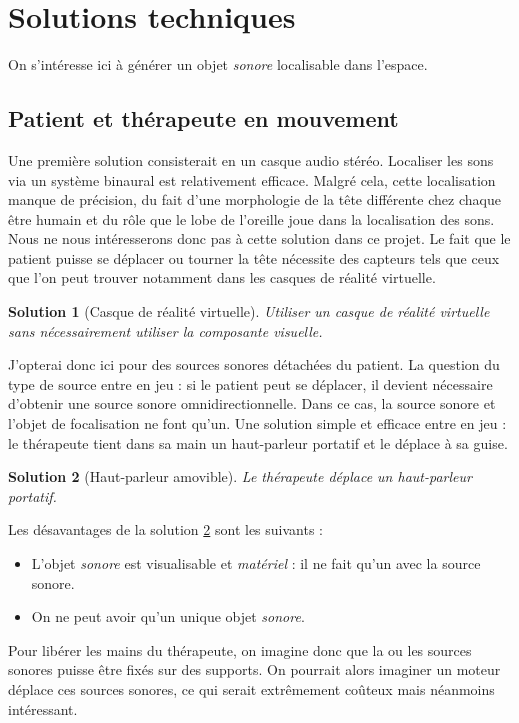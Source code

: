 \documentclass[french]{article}
\newtheorem{sol}{Solution}
\begin{document}
\section{Solutions techniques}

On s'intéresse ici à générer un objet \emph{sonore} localisable dans l'espace.

\subsection{Patient et thérapeute en mouvement}

Une première solution consisterait en un casque audio stéréo. Localiser les sons via un système binaural est relativement efficace. Malgré cela, cette localisation manque de précision, du fait d'une morphologie de la tête différente chez chaque être humain et du rôle que le lobe de l'oreille joue dans la localisation des sons. Nous ne nous intéresserons donc pas à cette solution dans ce projet. Le fait que le patient puisse se déplacer ou tourner la tête nécessite des capteurs tels que ceux que l'on peut trouver notamment dans les casques de réalité virtuelle.
\begin{sol}[Casque de réalité virtuelle]
	Utiliser un casque de réalité virtuelle sans nécessairement utiliser la composante visuelle.
\end{sol}

J'opterai donc ici pour des sources sonores détachées du patient. La question du type de source entre en jeu : si le patient peut se déplacer, il devient nécessaire d'obtenir une source sonore omnidirectionnelle. Dans ce cas, la source sonore et l'objet de focalisation ne font qu'un. Une solution simple et efficace entre en jeu : le thérapeute tient dans sa main un haut-parleur portatif et le déplace à sa guise.
\begin{sol}[Haut-parleur amovible]
	\label{hp-amovible}
	Le thérapeute déplace un haut-parleur portatif.
\end{sol}

Les désavantages de la solution \ref{hp-amovible} sont les suivants : 
\begin{itemize}[label={\textbullet}]
	\item L'objet \emph{sonore} est visualisable et \emph{matériel} : il ne fait qu'un avec la source sonore.
	\item On ne peut avoir qu'un unique objet \emph{sonore}.
\end{itemize}

Pour libérer les mains du thérapeute, on imagine donc que  la ou les sources sonores puisse être fixés sur des supports. On pourrait alors imaginer un moteur déplace ces sources sonores, ce qui serait extrêmement coûteux mais néanmoins intéressant.
\end{document}
